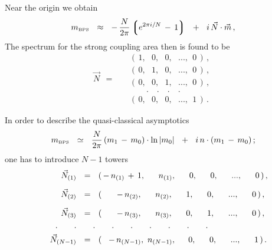 \documentclass[12pt,letterpaper,landscape,KOMA,smallheadings,calcdimensions,display]{powersem}
\newcommand{\mbps}{m_{\text{\tiny BPS}}}
\begin{document}
\begin{slide}
	Near the origin we obtain
\[
	\mbps ~~\approx~~ -\, \frac{N}{2\pi} \lgr e^{2\pi i / N} \,-\, 1 \rgr ~~+~~ i\, \vec{N} \cdot \vec{m}\,,
\]
	The spectrum for the strong coupling area then is found to be
\[
\label{scpn}
	\vec{N} ~~=~~ 
			\quad
				\begin{array}{l} 
					(\, 1,~~~   0,~~~   0,~~~ ...,~~ 0 \,)\,, \\[1.5mm]
					(\, 0,~~~   1,~~~   0,~~~ ...,~~ 0 \,)\,, \\[1.5mm]
					(\, 0,~~~   0,~~~   1,~~~ ...,~~ 0 \,)\,, \\[0.5mm]
					\quad\quad.\quad.\quad.\quad.         \\
					(\, 0,~~~   0,~~~   0,~~~ ...,~~ 1 \,)\,.
				\end{array} 
\]
\vspace{-0.8cm}

\end{slide}


\begin{slide}

	In order to describe the quasi-classical asymptotics
\[
\mbps ~~\simeq~~ \frac{N}{2\pi}\,
		( m_1 \,-\, m_0 ) \cdot \ln |m_0 |
	    ~~+~~
	i\, n \cdot ( m_1 \,-\, m_0 )\,;
\]
	one has to introduce $ N - 1 $ towers
\begin{align*}
%
\notag
	\vec{N}_{(1)} & ~~=~~ (\, -\,n_{(1)} \,+\, 1,~~~~\; n_{(1)},~~~~\; 0,~~~~\; 0,~~~~\; ...,~~~~\; 0 \,)\,,  
	\\[2mm]
%
\notag
	\vec{N}_{(2)} & ~~=~~ (\, ~~~~~-\,n_{(2)},~~~~\; n_{(2)},~~~~\; 1,~~~~\; 0,~~~~\; ...,~~~~\; 0 \,)\,,
	\\[2mm]
%
	\vec{N}_{(3)} & ~~=~~ (\, ~~~~~-\,n_{(3)},~~~~\; n_{(3)},~~~~\; 0,~~~~\; 1,~~~~\; ...,~~~~\; 0 \,)\,,
	\\
%
\notag
	\qquad.\qquad.
	              & \qquad.\qquad.\qquad.\qquad.\qquad.\qquad.\qquad.
	\\
%
\notag
	\vec{N}_{(N-1)} & ~~=~~ (\, ~~-\,n_{(N-1)},~ n_{(N-1)},~~~~\, 0,~~~~\; 0,~~~~\; ...,~~~~\; 1 \,)\,.
\end{align*}

\stepwise{
\step{
\vspace{-0.2cm}
\centerline{\textcolor{magenta}{This is the spectrum which satisfies all three criteria}}
}
\step{
\vspace{-0.7cm}
\[
	\mbps ~~=~~ U_0 (m_0) ~~+~~ i\, n_{(k)} \cdot ( m_1 \,-\, m_0 ) ~~+~~ i\, m_k\,,
	\qquad {\scriptstyle k ~=~ 1,\,...,\, N-1\,}.
\]
}
}

\end{slide}
\end{document}
